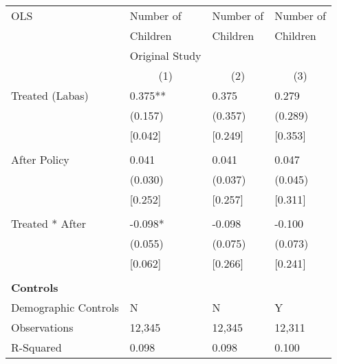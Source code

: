 \begin{tabular}{p{4cm}p{1.5cm}p{1.5cm}p{1.5cm}}
\hline\hline
OLS               &Number of & Number of &Number of \\
&Children & Children & Children\\
&Original Study & &  \\
&\multicolumn{1}{c}{(1)}&\multicolumn{1}{c}{(2)}&\multicolumn{1}{c}{(3)}\\
\hline
Treated (Labas)   &  0.375**&   0.375 & 0.279 \\
                &  (0.157)&  (0.357) & (0.289)\\
									& [0.042]	 &  [0.249]&  [0.353]\\										
                \\
After Policy   &   0.041&   0.041 &0.047\\
                &  (0.030)&  (0.037) & (0.045)\\
									& [0.252]	 &  [0.257]&  [0.311]\\										
                \\
Treated * After   & -0.098*&  -0.098 & -0.100\\
                &  (0.055)&  (0.075) &(0.073)\\
									& [0.062]	 &  [0.266]&  [0.241]\\										
                \\

\multicolumn{4}{l}{\textbf{Controls}}  \\                  
Demographic Controls       &   N     &        N&        Y\\

\hline
Observations    &    12,345&    12,345 & 12,311\\
R-Squared    &  0.098   & 0.098 & 0.100     \\
\hline\hline
\end{tabular}
